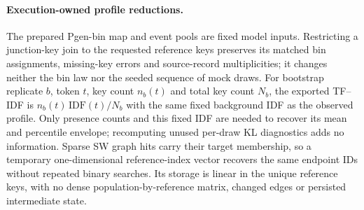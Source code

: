 \documentclass[10pt,a4paper]{article}
\theoremstyle{definition}
\begin{document}
\paragraph{Execution-owned profile reductions.}
The prepared Pgen-bin map and event pools are fixed model inputs.
Restricting a junction-key join to the requested reference keys preserves its
matched bin assignments, missing-key errors and source-record multiplicities;
it changes neither the bin law nor the seeded sequence of mock draws.
For bootstrap replicate $b$, token $t$, key count $n_b(t)$ and total key count
$N_b$, the exported TF--IDF is $n_b(t)\,\mathrm{IDF}(t)/N_b$ with the same fixed
background IDF as the observed profile.
Only presence counts and this fixed IDF are needed to recover its mean and
percentile envelope; recomputing unused per-draw KL diagnostics adds no information.
Sparse SW graph hits carry their target membership, so a temporary one-dimensional
reference-index vector recovers the same endpoint IDs without repeated binary
searches. Its storage is linear in the unique reference keys, with no dense
population-by-reference matrix, changed edges or persisted intermediate state.
\end{document}
